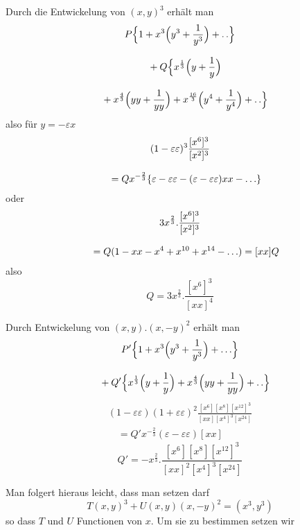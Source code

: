 Durch die Entwickelung von $(x,y)^3$ erhält man
\[
\begin{gathered}P\Bigl\{1+x^3\Bigl(y^3+\frac{1}{y^3}\Bigr)+.\,.\Bigr\}
\\[8pt]\quad{}+Q\Bigl\{x^{\frac13}\Bigl(y+\frac1y\Bigr)
\\[8pt]\quad{}+x^{\frac43}\Bigl(yy+\frac1{yy}\Bigr)
+x^{\frac{16}3}\Bigl(y^4+\frac1{y^4}\Bigr)+.\,.\Bigr\}\end{gathered}
\]
also für $y=-\varepsilon x$
\[
\begin{gathered}(1-\varepsilon\varepsilon)^3\frac{[x^6]^3}{[x^2]^3}
\\[8pt]\quad{}=Qx^{-\frac23}\{\varepsilon-\varepsilon\varepsilon
-(\varepsilon-\varepsilon\varepsilon)xx-\mathinner{.\,.\,.}\}\end{gathered}
\]
oder
\[
\begin{gathered}3x^{\frac23}.\frac{[x^6]^3}{[x^2]^3}
\\[8pt]\quad{}=Q(1-xx-x^4+x^{10}+x^{14}-\mathinner{.\,.\,.})=[xx]Q\end{gathered}
\]
also
\[
Q=3x^{\frac23}.\frac{[x^6]^3}{[xx]^4}
\]

Durch Entwickelung von $(x,y).(x,-y)^2$ erhält man
\[
\begin{gathered}P'\Bigl\{1+x^3\Bigl(y^3+\frac1{y^3}\Bigr)+\mathinner{.\,.\,.}\Bigr\}
\\[8pt]\quad{}+Q'\Bigl\{x^{\frac13}\Bigl(y+\frac1y\Bigr)
+x^{\frac43}\Bigl(yy+\frac1{yy}\Bigr)+.\,.\Bigr\}\end{gathered}
\]
\[
\begin{gathered}(1-\varepsilon\varepsilon)(1+\varepsilon\varepsilon)^2
\frac{[x^6][x^8][x^{12}]^3}{[xx][x^4]^3[x^{24}]}
\\[8pt]\quad{}=Q'x^{-\frac23}(\varepsilon-\varepsilon\varepsilon)[xx]\end{gathered}
\]
\[
Q'=-x^{\frac23}.\frac{[x^6][x^8][x^{12}]^3}{[xx]^2[x^4]^3[x^{24}]}
\]

Man folgert hieraus leicht, dass man setzen darf
\[
T(x,y)^3+U(x,y)(x,-y)^2=(x^3,y^3)
\]
so dass $T$ und $U$ Functionen von $x$. Um sie zu bestimmen setzen wir



